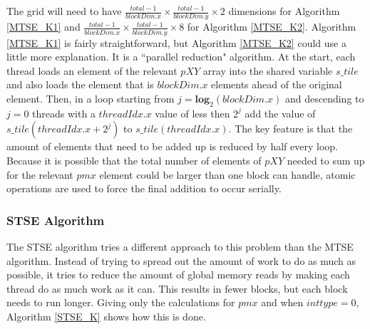 \documentclass[12pt]{report}
\begin{document}
The grid will need to have $\frac{total - 1}{blockDim.x} \times \frac{total - 1}{blockDim.y} \times 2$ dimensions for Algorithm \ref{MTSE_K1} and $\frac{total - 1}{blockDim.x} \times \frac{total - 1}{blockDim.y} \times 8$ for Algorithm \ref{MTSE_K2}. Algorithm \ref{MTSE_K1} is fairly straightforward, but Algorithm \ref{MTSE_K2} could use a little more explanation. It is a ``parallel reduction" algorithm. At the start, each thread loads an element of the relevant $pXY$ array into the shared variable $s\_tile$ and also loads the element that is $blockDim.x$ elements ahead of the original element. Then, in a loop starting from $j= \textbf{log}_{2}(blockDim.x)$ and descending to $j = 0$ threads with a $threadIdx.x$ value of less then $2^{j}$ add the value of  $s\_tile(threadIdx.x + 2^{j})$ to $s\_tile(threadIdx.x)$. The key feature is that the amount of elements that need to be added up is reduced by half every loop. Because it is possible that the total number of elements of $pXY$ needed to sum up for the relevant $pmx$ element could be larger than one block can handle, atomic operations are used to force the final addition to occur serially.

\subsubsection{STSE Algorithm}
The STSE algorithm tries a different approach to this problem than the MTSE algorithm. Instead of trying to spread out the amount of work to do as much as possible, it tries to reduce the amount of global memory reads by making each thread do as much work as it can. This results in fewer blocks, but each block needs to run longer. Giving only the calculations for $pmx$ and when $inttype = 0$, Algorithm \ref{STSE_K} shows how this is done.
\end{document}
